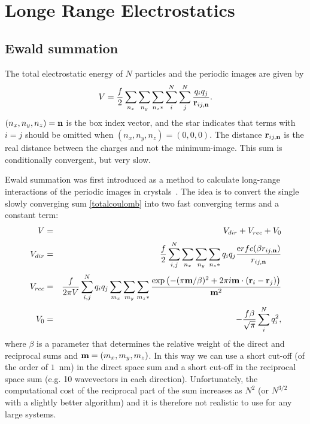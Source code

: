 \section{Longe Range Electrostatics}
\subsection{Ewald summation}
\label{sec:ewald}
The total electrostatic energy of $N$ particles and the periodic
images are given by
\begin{equation}
V=\frac{f}{2}\sum_{n_x}\sum_{n_y}
\sum_{n_{z}*} \sum_{i}^{N} \sum_{j}^{N} 
\frac{q_i q_j}{{\bf r}_{ij,{\bf n}}}.
\label{totalcoulomb}
\end{equation}
$(n_x,n_y,n_z)={\bf n}$ is the box index vector, and the star indicates that
terms with $i=j$ should be omitted when $(n_x,n_y,n_z)=(0,0,0)$. The
distance ${\bf r}_{ij,{\bf n}}$ is the real distance between the charges and
not the minimum-image. This sum is conditionally convergent, but 
very slow.

Ewald summation was first introduced as a method to calculate
long-range interactions of the periodic images in
crystals~\cite{Ewald21}. The idea is to convert the single slowly converging
sum \ref{totalcoulomb} into two fast converging terms and a constant
term:
\begin{eqnarray}
V &=& V_{dir} + V_{rec} + V_{0} \\[0.5ex]
V_{dir} &=& \frac{f}{2} \sum_{i,j}^{N} 
\sum_{n_x}\sum_{n_y}
\sum_{n_{z}*} q_i q_j \frac{{\mathrm erfc}(\beta {r}_{ij,{\bf n}} )}{{r}_{ij,{\bf n}}} \\[0.5ex]
V_{rec} &=& \frac{f}{2 \pi V} \sum_{i,j}^{N} q_i q_j 
\sum_{m_x}\sum_{m_y}
\sum_{m_{z}*} \frac{\exp{\left( -(\pi {\bf m}/\beta)^2 + 2 \pi i
      {\bf m} \cdot ({\bf r}_i - {\bf r}_j)\right)}}{{\bf m}^2} \\[0.5ex]
V_{0} &=& -\frac{f \beta}{\sqrt{\pi}}\sum_{i}^{N} q_i^2,
\end{eqnarray}
where $\beta$ is a parameter that determines the relative weight of the
direct and reciprocal sums and ${\bf m}=(m_x,m_y,m_z)$.
In this way we can use a short cut-off (of the order of $1$~nm) in the direct space sum and a
short cut-off in the reciprocal space sum (e.g. 10 wavevectors in each 
direction). Unfortunately, the computational cost of the reciprocal
part of the sum increases as $N^2$
(or $N^{3/2}$ with a slightly better algorithm) and it is therefore not 
realistic to use for any large systems.

